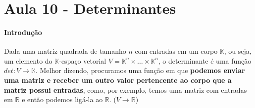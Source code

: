 \documentclass[12pt]{article}
\begin{document}
\section*{Aula 10 - Determinantes}
\paragraph{Introdução\\}
	Dada uma matriz quadrada	de tamanho $n$ com entradas em um corpo $\mathbb{K}$, ou seja, um elemento
	do $\mathbb{K}$-espaço vetorial $V = \mathbb{K}^n \times \dots \times \mathbb{K}^n$, o determinante é uma função
	$det: V \rightarrow \mathbb{K}$. Melhor dizendo, procuramos uma função em que \textbf{podemos enviar uma matriz e receber
	um outro valor pertencente ao corpo que a matriz possui entradas}, como, por exemplo, temos uma matriz com entradas em $				\mathbb{R}$ e então podemos ligá-la ao $\mathbb{R}$.
	($V \rightarrow \mathbb{R}$)
	
\end{document}
